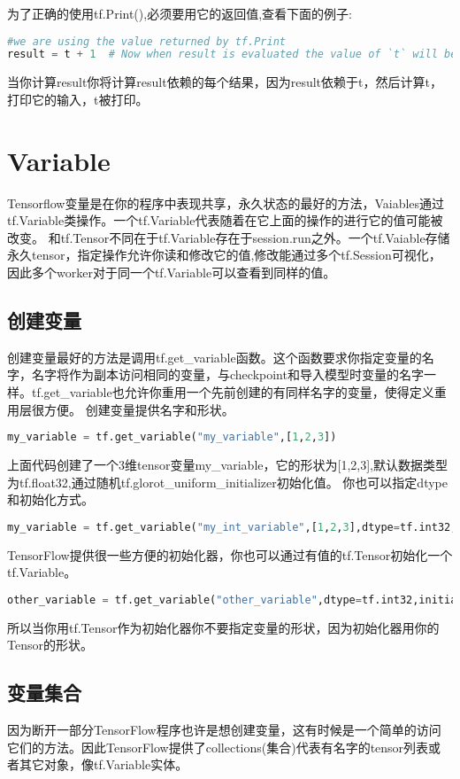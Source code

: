 为了正确的使用tf.Print(),必须要用它的返回值,查看下面的例子:
\begin{lstlisting}[language=Python]
	#we are using the value returned by tf.Print
result = t + 1  # Now when result is evaluated the value of `t` will be printed.
\end{lstlisting}
当你计算result你将计算result依赖的每个结果，因为result依赖于t，然后计算t，打印它的输入，t被打印。
\section{Variable}\label{sec:Variable}
Tensorflow变量是在你的程序中表现共享，永久状态的最好的方法，Vaiables通过tf.Variable类操作。一个tf.Variable代表随着在它上面的操作的进行它的值可能被改变。
和tf.Tensor不同在于tf.Variable存在于session.run之外。一个tf.Vaiable存储永久tensor，指定操作允许你读和修改它的值,修改能通过多个tf.Session可视化，因此多个worker对于同一个tf.Variable可以查看到同样的值。
\subsection{创建变量}
创建变量最好的方法是调用tf.get\_variable函数。这个函数要求你指定变量的名字，名字将作为副本访问相同的变量，与checkpoint和导入模型时变量的名字一样。tf.get\_variable也允许你重用一个先前创建的有同样名字的变量，使得定义重用层很方便。
创建变量提供名字和形状。
\begin{lstlisting}[language=Python]
	my_variable = tf.get_variable("my_variable",[1,2,3])
\end{lstlisting}
上面代码创建了一个3维tensor变量my\_variable，它的形状为[1,2,3],默认数据类型为tf.float32,通过随机tf.glorot\_uniform\_initializer初始化值。
你也可以指定dtype和初始化方式。
\begin{lstlisting}[language=Python]
	my_variable = tf.get_variable("my_int_variable",[1,2,3],dtype=tf.int32,initializer=tf.zeros_initializer)
\end{lstlisting}
TensorFlow提供很一些方便的初始化器，你也可以通过有值的tf.Tensor初始化一个tf.Variable。
\begin{lstlisting}[language=Python]
	other_variable = tf.get_variable("other_variable",dtype=tf.int32,initializer=tf.constant([23,42]))
\end{lstlisting}
所以当你用tf.Tensor作为初始化器你不要指定变量的形状，因为初始化器用你的Tensor的形状。
\subsection{变量集合}
因为断开一部分TensorFlow程序也许是想创建变量，这有时候是一个简单的访问它们的方法。因此TensorFlow提供了collections(集合)代表有名字的tensor列表或者其它对象，像tf.Variable实体。

